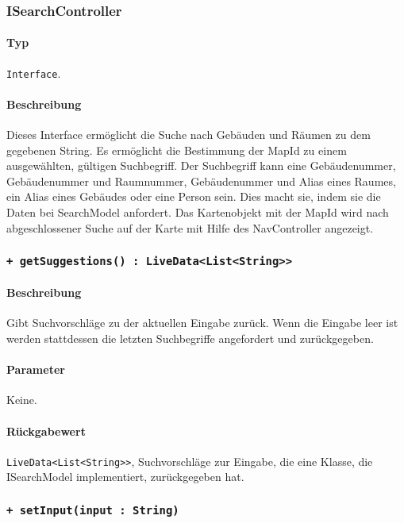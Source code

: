 \subsubsection{ISearchController}\label{App_Search_ISearchController}
\paragraph*{Typ}
\texttt{Interface}.
\paragraph*{Beschreibung}
Dieses Interface ermöglicht die Suche nach Gebäuden und Räumen zu dem gegebenen String. 
Es ermöglicht die Bestimmung der MapId zu einem ausgewählten, gültigen Suchbegriff. 
Der Suchbegriff kann eine Gebäudenummer, Gebäudenummer und Raumnummer, Gebäudenummer und Alias eines Raumes, ein Alias eines Gebäudes oder eine Person sein.
Dies macht sie, indem sie die Daten bei SearchModel anfordert.
Das Kartenobjekt mit der MapId wird nach abgeschlossener Suche auf der Karte mit Hilfe des NavController angezeigt.


\subsubsection*{\texttt{+ getSuggestions() : LiveData<List<String>>}}\label{App_Search_ISearchController_getSuggestions}%
\paragraph*{Beschreibung}
Gibt Suchvorschläge zu der aktuellen Eingabe zurück.
Wenn die Eingabe leer ist werden stattdessen die letzten Suchbegriffe angefordert und zurückgegeben.
\paragraph*{Parameter}
Keine.
\paragraph*{Rückgabewert}
\texttt{LiveData<List<String>>}, Suchvorschläge zur Eingabe, die eine Klasse, die ISearchModel implementiert, zurückgegeben hat.

\subsubsection*{\texttt{+ setInput(input : String)}}\label{App_Search_ISearchController_setInput}%
